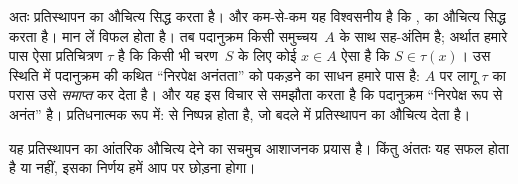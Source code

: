 \documentclass[../../../include/open-logic-section]{subfiles}
\begin{document}
अतः \stagescofin{} प्रतिस्थापन का औचित्य सिद्ध करता है। और कम-से-कम यह
विश्वसनीय है कि \stagesinex{}, \stagescofin{} का औचित्य सिद्ध करता है। मान
लें \stagescofin{} विफल होता है। तब पदानुक्रम किसी समुच्चय~$A$ के साथ
सह-अंतिम है; अर्थात हमारे पास ऐसा प्रतिचित्रण $\tau$ है कि किसी भी चरण~$S$
के लिए कोई $x \in A$ ऐसा है कि $S \in \tau(x)$। उस स्थिति में पदानुक्रम की
कथित ``निरपेक्ष अनंतता'' को पकड़ने का साधन हमारे पास है: $A$ पर लागू
$\tau$ का परास उसे \emph{समाप्त} कर देता है। और यह इस विचार से समझौता करता
है कि पदानुक्रम ``निरपेक्ष रूप से अनंत'' है। प्रतिधनात्मक रूप में:
\stagesinex{} से \stagescofin{} निष्पन्न होता है, जो बदले में प्रतिस्थापन का
औचित्य देता है।

यह प्रतिस्थापन का आंतरिक औचित्य देने का सचमुच आशाजनक प्रयास है। किंतु अंततः
यह सफल होता है या नहीं, इसका निर्णय हमें आप पर छोड़ना होगा।
\end{document}

